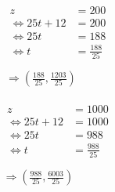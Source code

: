 \documentclass[a4paper]{scrartcl}
\newcommand{\gdw}{\Leftrightarrow}
\begin{document}
\begin{enumerate}
\begin{enumerate}
                \begin{equation}
                    \begin{gathered}
                        \begin{split}
                            z &= 200 \\
                            \gdw 25t + 12 &= 200 \\
                            \gdw 25t &= 188 \\
                            \gdw t &= \frac{188}{25} \\
                        \end{split} \\
                        \Rightarrow \left( \frac{188}{25}, \frac{1203}{25} \right)
                    \end{gathered}
                \end{equation}

                \begin{equation}
                    \begin{gathered}
                        \begin{split}
                            z &= 1000 \\
                            \gdw 25t + 12 &= 1000 \\
                            \gdw 25t &= 988 \\
                            \gdw t &= \frac{988}{25} \\
                        \end{split} \\
                        \Rightarrow \left( \frac{988}{25}, \frac{6003}{25} \right)
                    \end{gathered}
                \end{equation}
                

        \end{enumerate}


\end{enumerate}
\end{document}
